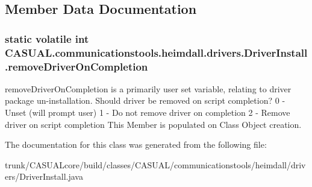 \subsection{Member Data Documentation}
\hypertarget{class_c_a_s_u_a_l_1_1communicationstools_1_1heimdall_1_1drivers_1_1_driver_install_a12318e9687dad09e3f4978e7befd789b}{
\subsubsection[{remove\-Driver\-On\-Completion}]{\setlength{\rightskip}{0pt plus 5cm}static volatile int C\-A\-S\-U\-A\-L.\-communicationstools.\-heimdall.\-drivers.\-Driver\-Install.\-remove\-Driver\-On\-Completion\hspace{0.3cm}{\ttfamily [static]}}}\label{class_c_a_s_u_a_l_1_1communicationstools_1_1heimdall_1_1drivers_1_1_driver_install_a12318e9687dad09e3f4978e7befd789b}
remove\-Driver\-On\-Completion is a primarily user set variable, relating to driver package un-\/installation. Should driver be removed on script completion? 0 -\/ Unset (will prompt user) 1 -\/ Do not remove driver on completion 2 -\/ Remove driver on script completion This Member is populated on Class Object creation. 

The documentation for this class was generated from the following file\-:\begin{DoxyCompactItemize}
\item 
trunk/\-C\-A\-S\-U\-A\-Lcore/build/classes/\-C\-A\-S\-U\-A\-L/communicationstools/heimdall/drivers/Driver\-Install.\-java\end{DoxyCompactItemize}

